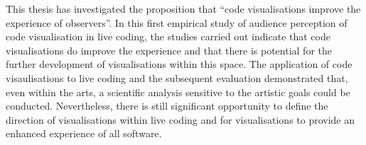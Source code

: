 This thesis has investigated the proposition that ``code visualisations improve the experience of observers''. In this first empirical study of audience perception of code visualisation in live coding, the studies carried out indicate that code visualisations do improve the experience and that there is potential for the further development of visualisations within this space. The application of code visaulisations to live coding and the subsequent evaluation demonstrated that, even within the arts, a scientific analysis sensitive to the artistic goals could be conducted. Nevertheless, there is still significant opportunity to define the direction of visualisations within live coding and for visualisations to provide an enhanced experience of all software.





